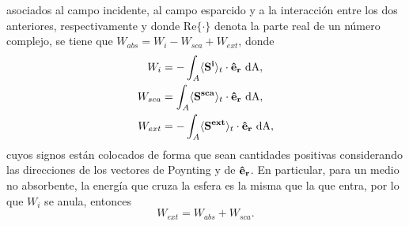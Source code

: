 \noindent asociados al campo incidente, al campo esparcido y a la interacción entre los dos anteriores, respectivamente y donde Re$\{\cdot\}$ denota la parte real de un número complejo, se tiene que $W_{abs}=W_i-W_{sca}+W_{ext}$, donde \cite{bohrenAbsorptionScatteringLight2008}
%
\begin{align} \label{eqs:W}
	W_i  &= -\int_{A}\langle\vb{S^i}\rangle_t\cdot\vb{\hat{e}_r}\text{ dA},\label{Wi}\\ W_{sca}&=\int_{A}\langle\vb{S^{sca}}\rangle_t\cdot\vb{\hat{e}_r}\text{ dA}, \label{Ws} \\ 
	W_{ext} &= -\int_{A}\langle\vb{S^{ext}}\rangle_t\cdot\vb{\hat{e}_r}\text{ dA},\label{Wext} 
\end{align}
%
cuyos signos están colocados de forma que sean cantidades positivas considerando las direcciones de los vectores de Poynting y de $\vb{\hat{e}_r}$. En particular, para un medio no absorbente, la energía que cruza la esfera es la misma que la que entra, por lo que $W_i$ se anula, entonces
%
\begin{equation}
	W_{ext}=W_{abs}+W_{sca}.
\end{equation}

